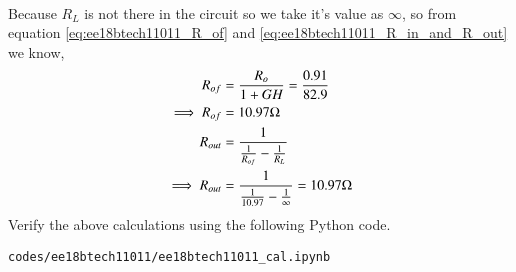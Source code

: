 \begin{enumerate}[label=\thesection.\arabic*.,ref=\thesection.\theenumi]
\begin{align}
\end{align}
%
Because $R_L$ is not there in the circuit so we take it's value as $\infty$, so from equation \ref{eq:ee18btech11011_R_of} and \ref{eq:ee18btech11011_R_in_and_R_out} we know,
%
\begin{align}
R_{o f} &= \frac{R_{o}}{1+GH} = \frac{0.91}{82.9}
\\
\implies R_{o f} &= 10.97\ohm
\\
R_{o u t} &= \frac{1}{\frac{1}{R_{o f}} - \frac{1}{R_{L}}}
\\
\implies R_{o u t} &= \frac{1}{\frac{1}{10.97} - \frac{1}{\infty}} = 10.97\ohm
\end{align}
%
Verify the above calculations using the following Python code.
\begin{lstlisting}
codes/ee18btech11011/ee18btech11011_cal.ipynb
\end{lstlisting}
\end{enumerate}

